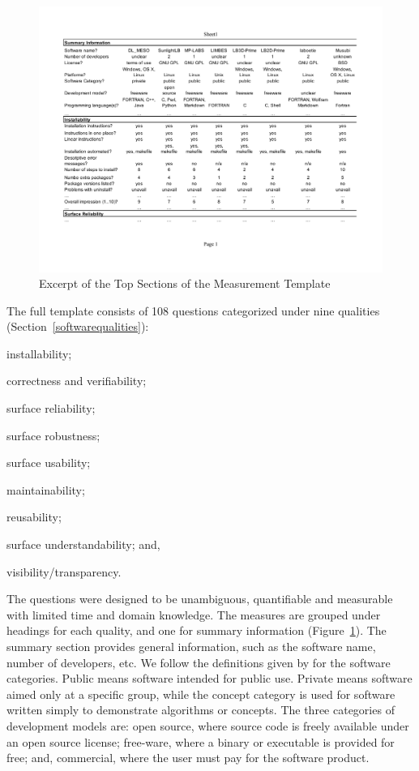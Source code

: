 \documentclass[final, 3p, times, authoryear]{elsarticle}
\begin{document}
\begin{figure}[!ht]
	\begin{center}
	  \includegraphics[width=1.0\textwidth]{./figures/measurement_template.pdf}
	  \caption{Excerpt of the Top Sections of the Measurement Template}
	  \label{measurement_template_image}
	\end{center}
\end{figure}

The full template consists of 108 questions categorized under nine qualities
(Section~\ref{softwarequalities}):
\begin{inparaenum}[(i)]
	\item installability;
	\item correctness and verifiability;
	\item surface reliability;
	\item surface robustness;
	\item surface usability;
	\item maintainability;
	\item reusability;
	\item surface understandability; and,
	\item visibility/transparency. 
\end{inparaenum} 

The questions were designed to be unambiguous, quantifiable and measurable with
limited time and domain knowledge. The measures are grouped under headings for
each quality, and one for summary information
(Figure~\ref{measurement_template_image}). The summary section provides general
information, such as the software name, number of developers, etc.  We follow
the definitions given by \citet{gewaltig2012quality} for the software
categories.  Public means software intended for public use.  Private means
software aimed only at a specific group, while the concept category is used for
software written simply to demonstrate algorithms or concepts. The three
categories of development models are: open source, where source code is freely
available under an open source license; free-ware, where a binary or executable
is provided for free; and, commercial, where the user must pay for the software
product.  
\end{document}
